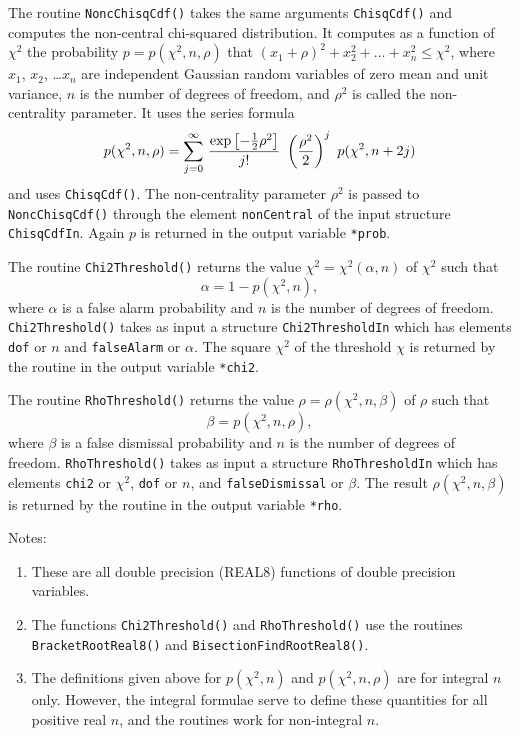 The routine \verb+NoncChisqCdf()+ takes the same arguments
\verb+ChisqCdf()+ and computes the non-central chi-squared
distribution.  It computes as a function of $\chi^2$ the
probability $p = p(\chi^2,n,\rho)$ that $(x_1+\rho)^2 + x_2^2 + \ldots
+ x_n^2 \le \chi^2$, 
where $x_1$, $x_2$, \ldots $x_n$ are independent Gaussian random
variables of zero mean and unit variance, $n$ is the number of
degrees of freedom, and $\rho^2$ is called the non-centrality
parameter.  It uses the series formula
$$
p(\chi^2,n,\rho) = \sum_{j=0}^\infty \, { \exp\left[ -{1 \over 2}
\rho^2 \right] \over j!} \ \left( {\rho^2 \over 2} \right)^j \
p(\chi^2,n+2j)
$$
and uses \verb+ChisqCdf()+.  The non-centrality parameter
$\rho^2$ is passed to \verb+NoncChisqCdf()+ through the element
\verb+nonCentral+ of the input structure \verb+ChisqCdfIn+.
Again $p$ is returned in the output variable \verb+*prob+.



The routine \verb+Chi2Threshold()+ returns the value $\chi^2 =
\chi^2(\alpha,n)$ of $\chi^2$ such that 
$$
\alpha = 1 - p(\chi^2,n),
$$
where $\alpha$ is a false alarm probability and $n$ is the number of
degrees of freedom.  \verb+Chi2Threshold()+ takes as input a
structure \verb+Chi2ThresholdIn+ which has elements \verb+dof+ or
$n$ and \verb+falseAlarm+ or $\alpha$.  The square $\chi^2$ of the
threshold $\chi$ is returned by the routine in the output variable
\verb+*chi2+. 




The routine \verb+RhoThreshold()+ returns the value $\rho =
\rho(\chi^2,n,\beta)$ of $\rho$ such that 
$$
\beta = p(\chi^2,n,\rho),
$$
where $\beta$ is a false dismissal probability and $n$ is the number
of degrees of freedom.  \verb+RhoThreshold()+ takes as input a
structure \verb+RhoThresholdIn+ which has elements \verb+chi2+ or
$\chi^2$, \verb+dof+ or $n$, and \verb+falseDismissal+ or $\beta$.
The result $\rho(\chi^2,n,\beta)$ is returned by the routine in the
output variable \verb+*rho+. 


Notes:
\begin{enumerate}
\item These are all double precision (REAL8) functions of double
precision variables.
\item The functions \verb+Chi2Threshold()+ and \verb+RhoThreshold()+
use the routines \verb+BracketRootReal8()+ and
\verb+BisectionFindRootReal8()+. 
\item The definitions given above for $p(\chi^2,n)$ and
$p(\chi^2,n,\rho)$ are for integral $n$ only.  However,
the integral formulae serve to define these quantities for all
positive real $n$, and the routines work for non-integral $n$.
\end{enumerate}

